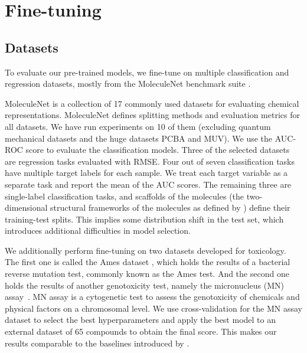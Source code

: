 \documentclass{article} %
\begin{document}
\section{Fine-tuning}
\subsection{Datasets}

To evaluate our pre-trained models, we fine-tune on multiple classification and regression datasets, mostly from the MoleculeNet benchmark suite \citep{moleculenet}.

MoleculeNet is a collection of 17 commonly used datasets for evaluating chemical representations. MoleculeNet defines splitting methods and evaluation metrics for all datasets. We have run experiments on 10 of them (excluding quantum mechanical datasets and the huge datasets PCBA and MUV). We use the AUC-ROC score to evaluate the classification models. Three of the selected datasets are regression tasks evaluated with RMSE. Four out of seven classification tasks have multiple target labels for each sample. We treat each target variable as a separate task and report the mean of the AUC scores. The remaining three are single-label classification tasks, and scaffolds of the molecules (the two-dimensional structural frameworks of the molecules as defined by \citet{scaffold1996}) define their training-test splits. This implies some distribution shift in the test set, which introduces additional difficulties in model selection.

We additionally perform fine-tuning on two datasets developed for toxicology. The first one is called the Ames dataset \citet{Ames}, which holds the results of a bacterial reverse mutation test, commonly known as the Ames test. And the second one holds the results of another genotoxicity test, namely the micronucleus (MN) assay~\citep{Micronucleus}. MN assay is a cytogenetic test to assess the genotoxicity of chemicals and physical factors on a chromosomal level.  %
We use cross-validation for the MN assay dataset to select the best hyperparameters and apply the best model to an external dataset of 65 compounds to obtain the final score. This makes our results comparable to the baselines introduced by \citep{Ames}. 
\end{document}
